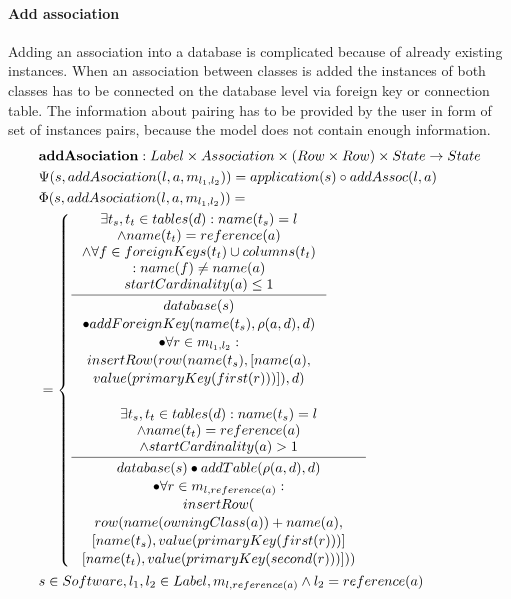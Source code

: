 \documentclass[11pt]{article}
\begin{document}
\paragraph{Add association} Adding an association into a database is complicated because of already existing instances. When an association between classes is added the instances of both classes has to be connected on the database level via foreign key or connection table. The information about pairing has to be provided by the user in form of set of instances pairs, because the model does not contain enough information. 
\begin{align*}
& \mathbf{addAsociation} : Label \times Association \times (Row \times Row) \times State \rightarrow State \\
& \Psi(s, addAsociation(l, a, m_{l_1, l_2})) = application(s) \circ addAssoc(l, a) \\
& \Phi(s, addAsociation(l, a, m_{l_1, l_2})) = \\
& =\begin{cases}
	\inference{ \exists t_s, t_t \in tables(d) : name(t_s) = l\\ 		\wedge name(t_t) = reference(a) \\ \wedge \forall f \in foreignKeys(t_t) \cup columns(t_t) \\: name(f) \neq name(a) \\ startCardinality(a) \leq 1}{\begin{gathered}
		database(s) \\ \bullet addForeignKey(name(t_s), \rho(a,d), d) \\ \bullet \forall r \in m_{l_1, l_2} : \\ insertRow(row(name(t_s), [name(a), \\ value(primaryKey(first(r)))]), d)
	\end{gathered}}
 \\ \\
	\inference{ \exists t_s, t_t \in tables(d) : name(t_s) = l \\ \wedge name(t_t) = reference(a) \\ \wedge startCardinality(a) > 1}{\begin{gathered} 
	database(s) \bullet addTable(\rho(a,d),d) \\ \bullet \forall r \in m_{l, reference(a)} :\\ insertRow(\\ row(name(owningClass(a)) + name(a), \\ [name(t_s), value(primaryKey(first(r)))]\\ [name(t_t), value(primaryKey(second(r)))]))
	\end{gathered}} 
\end{cases}\\
& s \in Software, l_1, l_2 \in Label, m_{l, reference(a)} \wedge l_2 = reference(a)
\end{align*}
\end{document}
